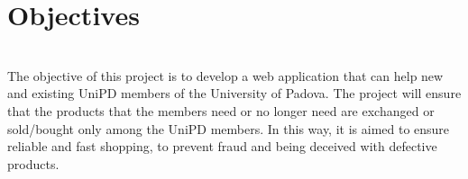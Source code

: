 \section{Objectives}\\


 \hspace{5mm}The objective of this project is to develop a web application that can help new and existing UniPD members of the University of Padova. The project will ensure that the products that the members need or no longer need are exchanged or sold/bought only among the UniPD members. In this way, it is aimed to ensure reliable and fast shopping, to prevent fraud and being deceived with defective products. 
